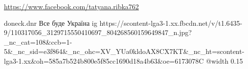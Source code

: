 
 
 
 
 

\url{https://www.facebook.com/tatyana.ribka762}\par
doneck.dnr
Все буде Україна
\ifcmt
  ig https://scontent-lga3-1.xx.fbcdn.net/v/t1.6435-9/110317056_3129715550410697_804268560159649847_n.jpg?_nc_cat=108&ccb=1-5&_nc_sid=e3f864&_nc_ohc=XV_YUa0kldoAX8CX7KT&_nc_ht=scontent-lga3-1.xx&oh=585a7b524b800e5f85cc1690d18a4b63&oe=6173078C
  @width 0.15
\fi

